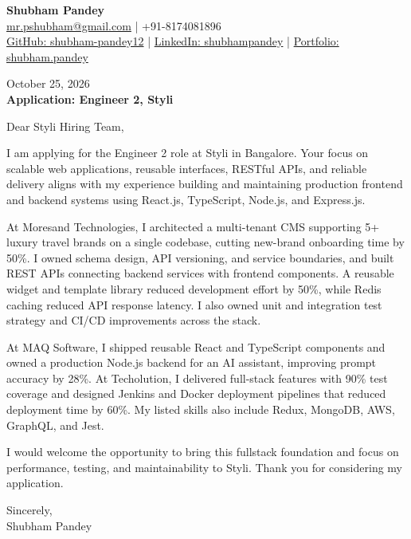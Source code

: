\documentclass[a4paper,10pt]{article}
\begin{document}
\begin{center}
{\LARGE\textbf{Shubham Pandey}}\\[3pt]
\href{mailto:mr.pshubham@gmail.com}{mr.pshubham@gmail.com} | +91-8174081896\\[2pt]
\href{https://github.com/shubham-pandey12}{GitHub: shubham-pandey12} | \href{https://www.linkedin.com/in/shubham-pandey-a74716199/}{LinkedIn: shubhampandey} | \href{https://shubham-portfolio-mocha.vercel.app/}{Portfolio: shubham.pandey}
\end{center}
October 25, 2026\\[6pt]
\textbf{Application: Engineer 2, Styli}

\vspace{12pt}
Dear Styli Hiring Team,

I am applying for the Engineer 2 role at Styli in Bangalore. Your focus on scalable web applications, reusable interfaces, RESTful APIs, and reliable delivery aligns with my experience building and maintaining production frontend and backend systems using React.js, TypeScript, Node.js, and Express.js.

\vspace{6pt}
At Moresand Technologies, I architected a multi-tenant CMS supporting 5+ luxury travel brands on a single codebase, cutting new-brand onboarding time by 50\%. I owned schema design, API versioning, and service boundaries, and built REST APIs connecting backend services with frontend components. A reusable widget and template library reduced development effort by 50\%, while Redis caching reduced API response latency. I also owned unit and integration test strategy and CI/CD improvements across the stack.

\vspace{6pt}
At MAQ Software, I shipped reusable React and TypeScript components and owned a production Node.js backend for an AI assistant, improving prompt accuracy by 28\%. At Techolution, I delivered full-stack features with 90\% test coverage and designed Jenkins and Docker deployment pipelines that reduced deployment time by 60\%. My listed skills also include Redux, MongoDB, AWS, GraphQL, and Jest.

\vspace{6pt}
I would welcome the opportunity to bring this fullstack foundation and focus on performance, testing, and maintainability to Styli. Thank you for considering my application.

\vspace{12pt}
Sincerely,\\[4pt]
Shubham Pandey
\end{document}
